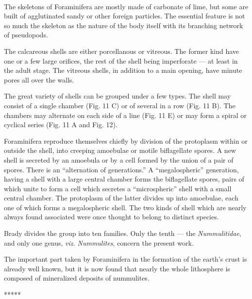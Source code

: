 \documentclass[a4paper, 12pt, oneside]{article}
\begin{document}
\paragraph{}
The skeletons of Foraminifera are mostly made of carbonate of lime, but some are built of agglutinated sandy or other foreign particles. The essential feature is not so much the skeleton as the nature of the body itself with its branching network of pseudopods.

The calcareous shells are either porcellanous or vitreous. The former kind have one or a few large orifices, the rest of the shell being imperforate --- at least in the adult stage. The vitreous shells, in addition to a main opening, have minute pores all over the walls.

The great variety of shells can be grouped under a few types. The shell may consist of a single chamber (Fig. 11 C) or of several in a row (Fig. 11 B). The chambers may alternate on each side of a line (Fig. 11 E) or may form a spiral or cyclical series (Fig. 11 A and Fig. 12).

Foraminifera reproduce themselves chiefly by division of the protoplasm within or outside the shell, into creeping amoebulae or motile biflagellate spores. A new shell is secreted by an amoebula or by a cell formed by the union of a pair of spores. There is an ``alternation of generations.'' A ``megalospheric'' generation, having a shell with a large central chamber forms the biflagellate spores, pairs of which unite to form a cell which secretes a ``microspheric'' shell with a small central chamber. The protoplasm of the latter divides up into amoebulae, each one of which forms a megalospheric shell. The two kinds of shell which are nearly always found associated were once thought to belong to distinct species.

Brady divides the group into ten families. Only the tenth --- the \emph{Nummulitidae}, and only one genus, \emph{viz.} \emph{Nummulites}, concern the present work.

The important part taken by Foraminifera in the formation of the earth's crust is already well known, but it is now found that nearly the whole lithosphere is composed of mineralized deposits of nummulites.

\centerline{*\hspace{15mm}*\hspace{15mm}*\hspace{15mm}*\hspace{15mm}*}
\bigskip
\end{document}
